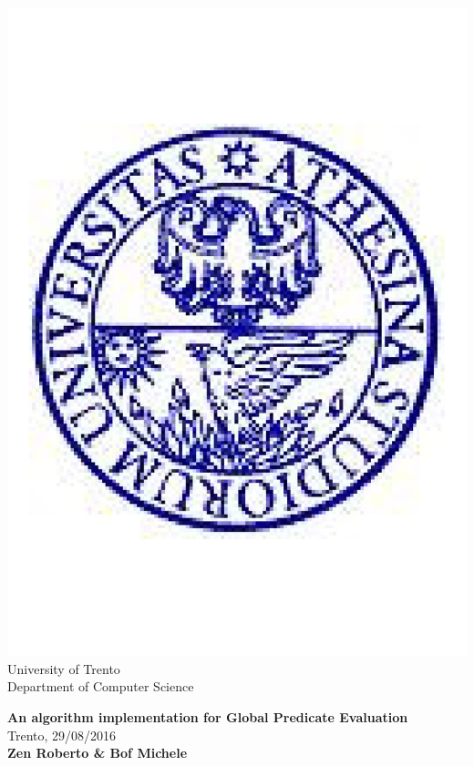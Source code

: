 \begin{titlepage}
\thispagestyle{plain}

\begin{center}
	\includegraphics[scale=0.12]{unitnlogo}	\\
	University of Trento	\\
	\small {Department of Computer Science}	\\[1cm]
\end{center}

{\centering
\textbf{\Huge An algorithm implementation for Global Predicate Evaluation}\\[1cm]
\small{Trento, 29/08/2016}	\\[1cm]
\textbf{Zen Roberto \& Bof Michele}

}
\vfill


\end{titlepage}
